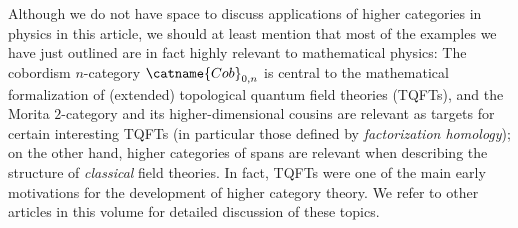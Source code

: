 \documentclass[a4paper,12pt]{article}
\begin{document}
\begin{remark}
  Although we do not have space to discuss applications of higher
  categories in physics in this article, we should at least mention
  that most of the examples we have just outlined are in fact highly
  relevant to mathematical physics: The cobordism $n$-category
  $\catname{Cob}_{0,n}$ is central to the mathematical formalization
  of (extended) topological quantum field theories (TQFTs), and the
  Morita $2$-category and its higher-dimensional cousins are relevant as
  targets for certain interesting TQFTs (in particular those defined
  by \emph{factorization homology}); on the other hand, higher
  categories of spans are relevant when describing the structure of
  \emph{classical} field theories. In fact, TQFTs were one of the main
  early motivations for the development of higher category theory. We
  refer to other articles in this volume for detailed discussion of
  these topics.
\end{remark}
\end{document}
